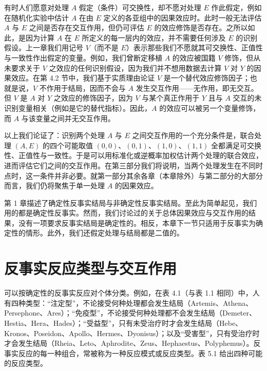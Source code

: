 有时人们愿意对处理 $A$ 假定（条件）可交换性，却不愿对处理 $E$ 作此假定，例如在随机化实验中估计 $A$ 在由 $E$ 定义的各亚组中的因果效应时。此时一般无法评估 $A$ 与 $E$ 之间是否存在交互作用，但仍可评估 $E$ 的效应修饰是否存在。之所以如此，是因为计算 $A$ 在 $E$ 所定义的每一层内的效应，并不需要任何涉及 $E$ 的识别假设。上一章我们用记号 $V$（而不是 $E$）表示那些我们不愿就其可交换性、正值性与一致性作出假定的变量。例如，我们曾断定移植 $A$ 的效应被国籍 $V$ 修饰，但从未要求关于 $V$ 之效应的任何识别假设，因为我们并不想用数据去计算 $V$ 对 $Y$ 的因果效应。在第 4.2 节中，我们基于实质理由论证 $V$ 是一个替代效应修饰因子；也就是说，$V$ 不作用于结局，因而不会与 $A$ 发生交互作用——无作用，即无交互。但 $V$ 是 $A$ 对 $Y$ 之效应的修饰因子，因为 $V$ 与某个真正作用于 $Y$ 且与 $A$ 交互的未识别变量相关（例如是它的替代指标）。因此，$A$ 的效应可以被另一个变量修饰，而 $A$ 与该变量之间并无交互作用。


以上我们论证了：识别两个处理 $A$ 与 $E$ 之间交互作用的一个充分条件是，联合处理 $(A,E)$ 的四个可能取值 $(0,0)$、$(0,1)$、$(1,0)$、$(1,1)$ 全都满足可交换性、正值性与一致性。于是可以用标准化或逆概率加权估计两个处理的联合效应，进而评估它们之间的交互作用。在第三部分我们将说明，当两个处理发生在不同时点时，这一条件并非必要。就第一部分其余各章（本章除外）与第二部分的大部分而言，我们仍将聚焦于单一处理 $A$ 的因果效应。

第 1 章描述了确定性反事实结局与非确定性反事实结局。至此为简单起见，我们用的都是确定性反事实。然而，我们讨论过的关于总体因果效应与交互作用的结果，没有一项要求反事实结局是确定性的。相反，本章下一节只适用于反事实为确定性的情形。此外，我们还假定处理与结局都是二值的。

\section{反事实反应类型与交互作用}

可以按确定性的反事实反应对个体分类。例如，在表 4.1（与表 1.1 相同）中，人有四种类型：“注定型”，不论接受何种处理都会发生结局（Artemis、Athena、Persephone、Ares）；“免疫型”，不论接受何种处理都不会发生结局（Demeter、Hestia、Hera、Hades）；“受益型”，只有未受治疗时才会发生结局（Hebe、Kronos、Poseidon、Apollo、Hermes、Dyonisus）；以及“受害型”，只有受治疗时才会发生结局（Rheia、Leto、Aphrodite、Zeus、Hephaestus、Polyphemus）。反事实反应的每一种组合，常被称为一种反应模式或反应类型。表 5.1 给出四种可能的反应类型。

